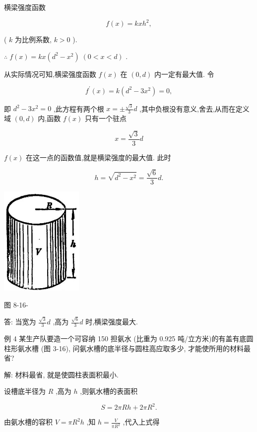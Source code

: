 \documentclass[10pt]{article}
\begin{document}
横梁强度函数

\[
f\left( x\right) = {kx}{h}^{2},
\]

( \(k\) 为比例系数, \(k > 0\) ).

\(\therefore \;f\left( x\right) = {kx}\left( {{d}^{2} - {x}^{2}}\right) \;\left( {0 < x < d}\right)\) .

从实际情况可知,横梁强度函数 \(f\left( x\right)\) 在 \(\left( {0,d}\right)\) 内一定有最大值. 令

\[
{f}^{\prime }\left( x\right) = k\left( {{d}^{2} - 3{x}^{2}}\right) = 0,
\]

即 \({d}^{2} - 3{x}^{2} = 0\) ,此方程有两个根 \(x = \pm \frac{\sqrt{3}}{3}d\) ,其中负根没有意义,舍去,从而在定义域 \(\left( {0,d}\right)\) 内,函数 \(f\left( x\right)\) 只有一个驻点

\[
x = \frac{\sqrt{3}}{3}d
\]

\(f\left( x\right)\) 在这一点的函数值,就是横梁强度的最大值. 此时

\[
h = \sqrt{{d}^{2} - {x}^{2}} = \frac{\sqrt{6}}{3}d.
\]

\begin{center}
\includegraphics[max width=0.3\textwidth]{images/01912c18-5c3f-733d-b775-749ba9897a9d_150_751406.jpg}
\end{center}

图 8-16-

答: 当宽为 \(\frac{\sqrt{3}}{3}d\) ,高为 \(\frac{\sqrt{6}}{3}d\) 时,横梁强度最大.

例 4 某生产队要造一个可容纳 150 担氨水 (比重为 0.925 吨/立方米)的有盖有底圆柱形氨水槽 (图 3-16), 问氨水槽的底半径与圆柱高应取多少, 才能使所用的材料最省?

解: 材料最省, 就是使圆柱表面积最小.

设槽底半径为 \(R\) ,高为 \(h\) ,则氨水槽的表面积

\[
S = {2\pi Rh} + {2\pi }{R}^{2}.
\]

由氨水槽的容积 \(V = \pi {R}^{2}h\) ,知 \(h = \frac{V}{\pi {R}^{2}}\) ,代入上式得
\end{document}
